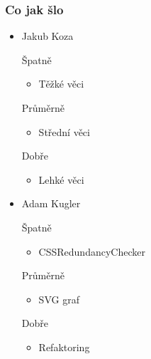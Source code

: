 \documentclass{beamer}
\begin{document}
\begin{frame}[allowframebreaks]\frametitle{Co jak šlo}
  \begin{itemize}
    \item Jakub Koza
     \begin{block}{Špatně} %
       \begin{itemize}
        \item Těžké věci
       \end{itemize}
     \end{block}
     \begin{block}{Průměrně} %
        \begin{itemize}
        \item Střední věci
       \end{itemize}
     \end{block}
     \begin{block}{Dobře} %
       \begin{itemize}
        \item Lehké věci
       \end{itemize}
     \end{block}
   
    \item Adam Kugler
      \begin{block}{Špatně} %
       \begin{itemize}
        \item CSSRedundancyChecker
       \end{itemize}
     \end{block}
     \begin{block}{Průměrně} %
        \begin{itemize}
        \item SVG graf
       \end{itemize}
     \end{block}
     \begin{block}{Dobře} %
       \begin{itemize}
        \item Refaktoring
       \end{itemize}
     \end{block}
  

\end{itemize}
\end{frame}
\end{document}
